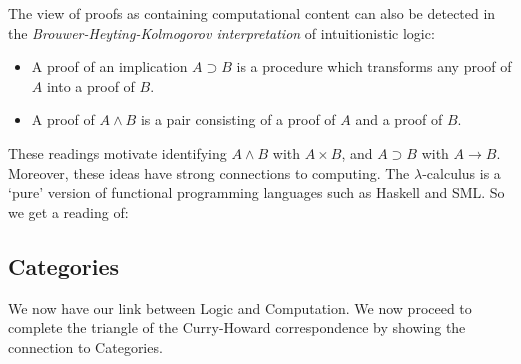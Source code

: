 \documentclass[12pt]{article}
\begin{document}
%
The view of proofs as containing computational content can also be detected in the \emph{Brouwer-Heyting-Kolmogorov interpretation} of intuitionistic
logic:
\begin{itemize}
\item A proof of an implication $A \supset B$ is a procedure which transforms any proof of $A$ into a proof of $B$.
\item A proof of $A \wedge B$ is a pair consisting of a proof of $A$  and a proof of $B$.
\end{itemize}
These readings motivate identifying $A \wedge B$ with $A \times B$, and $A \supset B$ with $A \rightarrow B$.
%
Moreover, these ideas have strong connections to computing. The $\lambda$-calculus is a `pure' version of functional programming languages such as
Haskell and SML. So we get a reading of:
\begin{center}
\end{center}


\subsection{Categories}
We now have our link between Logic and Computation. We now proceed to complete the triangle of the Curry-Howard correspondence by showing the connection to Categories.
\end{document}
